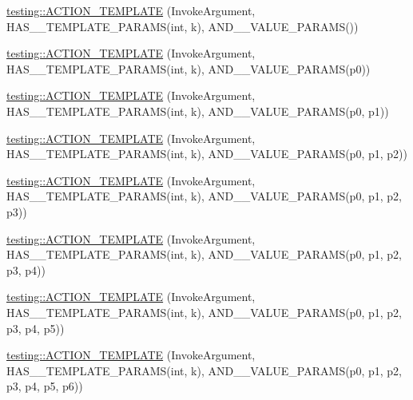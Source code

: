 \begin{DoxyCompactItemize}
\item 
\hyperlink{namespacetesting_a8a02397c7fdf8e84d559ab72dcc28eb1}{testing\+::\+A\+C\+T\+I\+O\+N\+\_\+\+T\+E\+M\+P\+L\+A\+TE} (Invoke\+Argument, H\+A\+S\+\_\+\_\+\+T\+E\+M\+P\+L\+A\+T\+E\+\_\+\+P\+A\+R\+A\+MS(int, k), A\+N\+D\+\_\+\_\+\+V\+A\+L\+U\+E\+\_\+\+P\+A\+R\+A\+MS())
\item 
\hyperlink{namespacetesting_afaa0d88f5442f9aee5d6147377d3e50c}{testing\+::\+A\+C\+T\+I\+O\+N\+\_\+\+T\+E\+M\+P\+L\+A\+TE} (Invoke\+Argument, H\+A\+S\+\_\+\_\+\+T\+E\+M\+P\+L\+A\+T\+E\+\_\+\+P\+A\+R\+A\+MS(int, k), A\+N\+D\+\_\+\_\+\+V\+A\+L\+U\+E\+\_\+\+P\+A\+R\+A\+MS(p0))
\item 
\hyperlink{namespacetesting_a39bf6c49dc1323cc9539a12249e60aba}{testing\+::\+A\+C\+T\+I\+O\+N\+\_\+\+T\+E\+M\+P\+L\+A\+TE} (Invoke\+Argument, H\+A\+S\+\_\+\_\+\+T\+E\+M\+P\+L\+A\+T\+E\+\_\+\+P\+A\+R\+A\+MS(int, k), A\+N\+D\+\_\+\_\+\+V\+A\+L\+U\+E\+\_\+\+P\+A\+R\+A\+MS(p0, p1))
\item 
\hyperlink{namespacetesting_ac50647216fdf5197899a3d5034a9a670}{testing\+::\+A\+C\+T\+I\+O\+N\+\_\+\+T\+E\+M\+P\+L\+A\+TE} (Invoke\+Argument, H\+A\+S\+\_\+\_\+\+T\+E\+M\+P\+L\+A\+T\+E\+\_\+\+P\+A\+R\+A\+MS(int, k), A\+N\+D\+\_\+\_\+\+V\+A\+L\+U\+E\+\_\+\+P\+A\+R\+A\+MS(p0, p1, p2))
\item 
\hyperlink{namespacetesting_ae98e43eecf8f44990b39b460f00b397b}{testing\+::\+A\+C\+T\+I\+O\+N\+\_\+\+T\+E\+M\+P\+L\+A\+TE} (Invoke\+Argument, H\+A\+S\+\_\+\_\+\+T\+E\+M\+P\+L\+A\+T\+E\+\_\+\+P\+A\+R\+A\+MS(int, k), A\+N\+D\+\_\+\_\+\+V\+A\+L\+U\+E\+\_\+\+P\+A\+R\+A\+MS(p0, p1, p2, p3))
\item 
\hyperlink{namespacetesting_a505f6d82df233802c5f4235d77dca164}{testing\+::\+A\+C\+T\+I\+O\+N\+\_\+\+T\+E\+M\+P\+L\+A\+TE} (Invoke\+Argument, H\+A\+S\+\_\+\_\+\+T\+E\+M\+P\+L\+A\+T\+E\+\_\+\+P\+A\+R\+A\+MS(int, k), A\+N\+D\+\_\+\_\+\+V\+A\+L\+U\+E\+\_\+\+P\+A\+R\+A\+MS(p0, p1, p2, p3, p4))
\item 
\hyperlink{namespacetesting_ab85e5f54a209bf141fc04f8612fbe887}{testing\+::\+A\+C\+T\+I\+O\+N\+\_\+\+T\+E\+M\+P\+L\+A\+TE} (Invoke\+Argument, H\+A\+S\+\_\+\_\+\+T\+E\+M\+P\+L\+A\+T\+E\+\_\+\+P\+A\+R\+A\+MS(int, k), A\+N\+D\+\_\+\_\+\+V\+A\+L\+U\+E\+\_\+\+P\+A\+R\+A\+MS(p0, p1, p2, p3, p4, p5))
\item 
\hyperlink{namespacetesting_a8d3590561f334d165c620f522219831b}{testing\+::\+A\+C\+T\+I\+O\+N\+\_\+\+T\+E\+M\+P\+L\+A\+TE} (Invoke\+Argument, H\+A\+S\+\_\+\_\+\+T\+E\+M\+P\+L\+A\+T\+E\+\_\+\+P\+A\+R\+A\+MS(int, k), A\+N\+D\+\_\+\_\+\+V\+A\+L\+U\+E\+\_\+\+P\+A\+R\+A\+MS(p0, p1, p2, p3, p4, p5, p6))

\end{DoxyCompactItemize}
